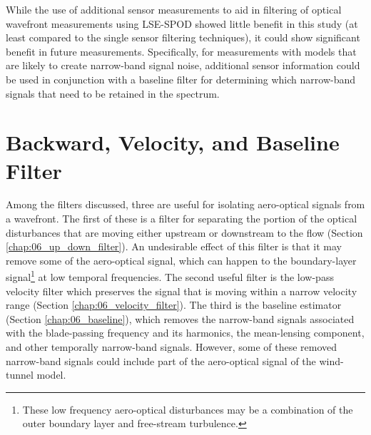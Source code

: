 While the use of additional sensor measurements to aid in filtering of optical wavefront measurements using LSE-SPOD showed little benefit in this study (at least compared to the single sensor filtering techniques), it could show significant benefit in future measurements.
Specifically, for measurements with models that are likely to create narrow-band signal noise, additional sensor information could be used in conjunction with a baseline filter for determining which narrow-band signals that need to be retained in the spectrum.


\section{Backward, Velocity, and Baseline Filter}
Among the filters discussed, three are useful for isolating aero-optical signals from a wavefront.
The first of these is a filter for separating the portion of the optical disturbances that are moving either upstream or downstream to the flow (Section  \ref{chap:06_up_down_filter}).
An undesirable effect of this filter is that it may remove some of the aero-optical signal, which can happen to the boundary-layer signal\footnote{These low frequency aero-optical disturbances may be a combination of the outer boundary layer and free-stream turbulence.} at low temporal frequencies.
The second useful filter is the low-pass velocity filter which preserves the signal that is moving within a narrow velocity range (Section \ref{chap:06_velocity_filter}).
The third is the baseline estimator (Section \ref{chap:06_baseline}), which removes the narrow-band signals associated with the blade-passing frequency and its harmonics, the mean-lensing component, and other temporally narrow-band signals.
However, some of these removed narrow-band signals could include part of the aero-optical signal of the wind-tunnel model.

